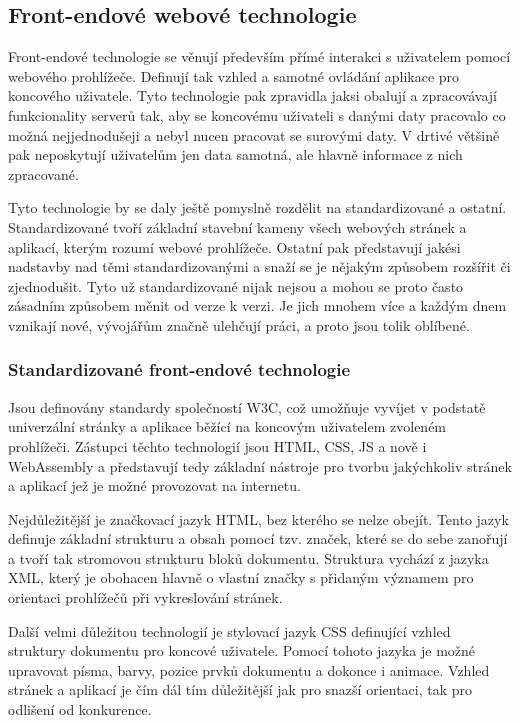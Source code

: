 	\subsection{Front-endové webové technologie}

	Front-endové technologie se věnují především přímé interakci s uživatelem pomocí webového prohlížeče.
	Definují tak vzhled a samotné ovládání aplikace pro koncového uživatele.
	Tyto technologie pak zpravidla jaksi obalují a zpracovávají funkcionality serverů tak, aby se koncovému uživateli s danými
	daty pracovalo co možná nejjednodušeji a nebyl nucen pracovat se surovými daty.
	V drtivé většině pak neposkytují uživatelům jen data samotná, ale hlavně informace z nich zpracované.

	Tyto technologie by se daly ještě pomyslně rozdělit na standardizované a ostatní.
	Standardizované tvoří základní stavební kameny všech webových stránek a aplikací, kterým rozumí webové
	prohlížeče.
	Ostatní pak představují jakési nadstavby nad těmi standardizovanými a snaží se je nějakým způsobem rozšířit
	či zjednodušit.
	Tyto už standardizované nijak nejsou a mohou se proto často zásadním způsobem měnit od verze k verzi.
	Je jich mnohem více a každým dnem vznikají nové, vývojářům značně ulehčují práci, a proto jsou tolik oblíbené.

		\subsubsection{Standardizované front-endové technologie}

		Jsou definovány standardy společností W3C, což umožňuje vyvíjet v podstatě univerzální stránky a aplikace běžící na
		koncovým uživatelem zvoleném prohlížeči.
		Zástupci těchto technologií jsou HTML, CSS, \ac{JS} a nově i WebAssembly a představují tedy základní
		nástroje pro tvorbu jakýchkoliv stránek a aplikací jež je možné provozovat na internetu. \cite{w3c_webdesign}

		Nejdůležitější je značkovací jazyk \Ac{HTML}, bez kterého se nelze obejít.
		Tento jazyk definuje základní strukturu a obsah pomocí tzv. značek, které se do sebe zanořují a
		tvoří tak stromovou strukturu bloků dokumentu.
		Struktura vychází z jazyka \Ac{XML}, který je obohacen hlavně
		o vlastní značky s přidaným významem pro orientaci prohlížečů při vykreslování stránek. \cite{html_hypertext_markup_language}

		Další velmi důležitou technologií je stylovací jazyk \Ac{CSS} definující vzhled struktury
		dokumentu pro koncové uživatele.
		Pomocí tohoto jazyka je možné upravovat písma, barvy, pozice prvků dokumentu a dokonce i animace.
		Vzhled stránek a aplikací je čím dál tím důležitější jak pro snazší orientaci, tak pro odlišení od konkurence.
		\cite{css_cascading_style_sheets}


